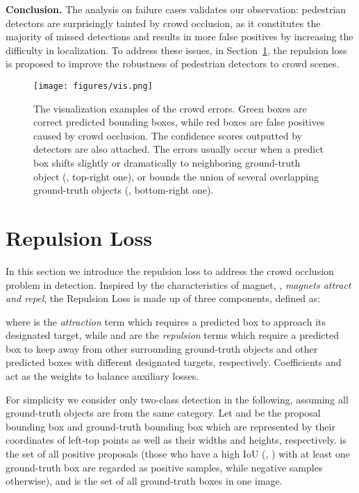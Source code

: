 \documentclass[10pt,twocolumn,letterpaper]{article}
\newcommand{\myparagraph}[1]{{\vspace{0.5em} \noindent \bf #1}}
\begin{document}
\myparagraph{Conclusion.}
The analysis on failure cases validates our observation: pedestrian detectors are surprisingly tainted by crowd occlusion, as it constitutes the majority of missed detections and results in more false positives by increasing the difficulty in localization. To address these issues, in Section~\ref{sec:approach}, the repulsion loss is proposed to improve the robustness of pedestrian detectors to crowd scenes.

\begin{figure}[t]
\texttt{[image: figures/vis.png]}
\caption{The visualization examples of the crowd errors. Green boxes are correct predicted bounding boxes, while red boxes are false positives caused by crowd occlusion. The confidence scores outputted by detectors are also attached. The errors usually occur when a predict box shifts slightly or dramatically to neighboring ground-truth object (\eg, top-right one), or bounds the union of several overlapping ground-truth objects (\eg, bottom-right one).}
\vspace{-0.2cm}
\label{fig:fp_vis}
\end{figure}

\section{Repulsion Loss}
\label{sec:approach}


In this section we introduce the repulsion loss to address the crowd occlusion problem in detection. Inspired by the characteristics of magnet, \ie, {\it magnets attract and repel}, the Repulsion Loss is made up of three components, defined as:

where  is the {\it attraction} term which requires a predicted box to approach its designated target, while  and  are the {\it repulsion} terms which require a predicted box to keep away from other surrounding ground-truth objects and other predicted boxes with different designated targets, respectively. Coefficients  and  act as the weights to balance auxiliary losses.

For simplicity we consider only two-class detection in the following, assuming all ground-truth objects are from the same category. Let  and  be the proposal bounding box and ground-truth bounding box which are represented by their coordinates of left-top points as well as their widths and heights, respectively.  is the set of all positive proposals (those who have a high IoU (\eg, ) with at least one ground-truth box are regarded as positive samples, while negative samples otherwise), and  is the set of all ground-truth boxes in one image.
\end{document}
